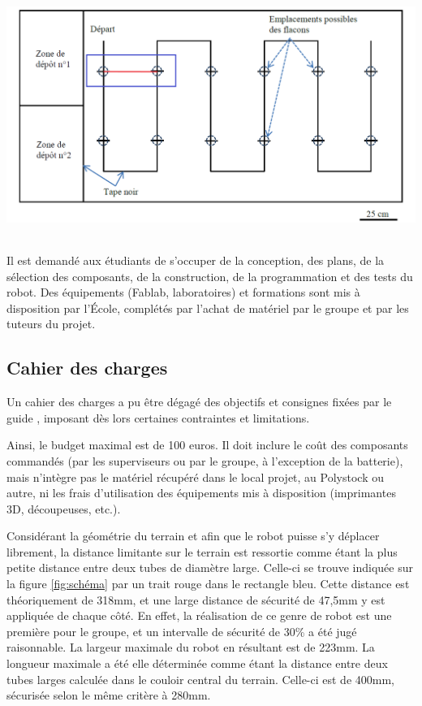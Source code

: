 \documentclass[a4paper,11pt]{article}
\begin{document}
\begin{center}
    \includegraphics[height=80mm]{schema_circuit.png}
\end{center}    

Il est demandé aux étudiants de s'occuper de la conception, des plans, de la sélection des composants, de la construction, de la programmation et des tests du robot. Des équipements (Fablab, laboratoires) et formations sont mis à disposition par l'École, complétés par l'achat de matériel par le groupe et par les tuteurs du projet.

\subsection{Cahier des charges}

Un cahier des charges a pu être dégagé des objectifs et consignes fixées par le guide \cite{guide}, imposant dès lors certaines contraintes et limitations.

Ainsi, le budget maximal est de 100 euros. Il doit inclure le coût des composants commandés (par les superviseurs ou par le groupe, à l'exception de la batterie), mais n'intègre pas le matériel récupéré dans le local projet, au Polystock ou autre, ni les frais d'utilisation des équipements mis à disposition (imprimantes 3D, découpeuses, etc.).

Considérant la géométrie du terrain et afin que le robot puisse s'y déplacer librement, la distance limitante sur le terrain est ressortie comme étant la plus petite distance entre deux tubes de diamètre large. Celle-ci se trouve indiquée sur la figure \ref{fig:schéma} par un trait rouge dans le rectangle bleu. Cette distance est théoriquement de 318mm, et une large distance de sécurité de 47,5mm y est appliquée de chaque côté. En effet, la réalisation de ce genre de robot est une première pour le groupe, et un intervalle de sécurité de 30\% a été jugé raisonnable. La largeur maximale du robot en résultant est de 223mm. La longueur maximale a été elle déterminée comme étant la distance entre deux tubes larges calculée dans le couloir central du terrain. Celle-ci est de 400mm, sécurisée selon le même critère à 280mm.
\end{document}
